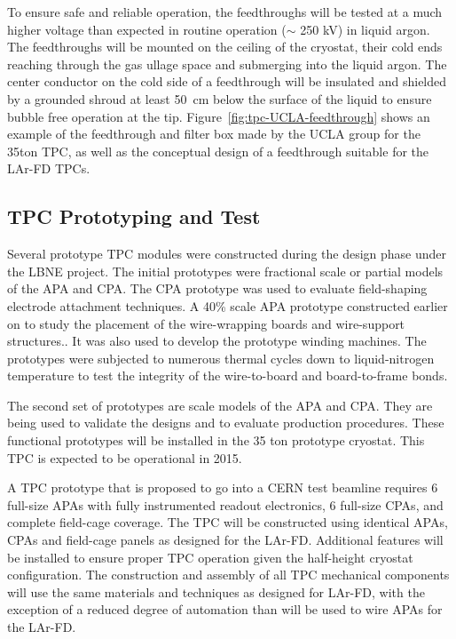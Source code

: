 To ensure safe and reliable operation, the feedthroughs will be tested at a much higher voltage than expected in
routine operation ($\sim$ 250 kV) in liquid argon. The feedthroughs will be mounted on the ceiling of the cryostat, their cold ends reaching 
through the gas ullage space and submerging into the liquid argon. The center conductor on the cold side of a feedthrough will be 
insulated and shielded by a grounded shroud at least 50~cm below the 
surface of the liquid to ensure bubble free operation at the tip. Figure~\ref{fig:tpc-UCLA-feedthrough} shows an example 
of the feedthrough and filter box made by the UCLA group for the 35ton TPC, as well as the conceptual design of a feedthrough suitable for the LAr-FD TPCs.


\subsection{TPC Prototyping and Test}
\label{subsec:fd-ref-tpc-proto}


Several prototype TPC modules were constructed during the design phase under the LBNE project. The initial prototypes were fractional scale or partial models of the APA and CPA. The CPA prototype was used to evaluate field-shaping electrode attachment techniques. A 40\% scale APA prototype constructed earlier on to study the placement of the wire-wrapping boards and wire-support structures.. It was also used to develop the prototype winding machines. The prototypes were subjected to numerous thermal cycles down to liquid-nitrogen temperature to test the integrity of the wire-to-board and board-to-frame bonds. 

The second set of prototypes are scale models of the APA and CPA. They are being used to validate the designs and to evaluate production procedures. These functional prototypes will be installed in the 35 ton prototype cryostat. This TPC is expected to be operational in 2015.

A TPC prototype that is proposed to go into a CERN test beamline requires 6 full-size APAs with fully instrumented readout electronics, 6 full-size CPAs, and complete field-cage coverage. The TPC will be constructed using identical APAs, CPAs and field-cage panels as designed for the LAr-FD. Additional features will be installed to ensure proper TPC operation given the half-height cryostat configuration. The construction and assembly of all TPC mechanical components will use the same materials and techniques as designed for LAr-FD, with the exception of a reduced degree of automation than will be used to wire APAs for the LAr-FD. 




